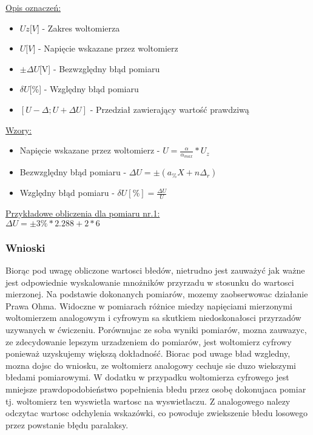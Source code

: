 \documentclass{extarticle}  %
\begin{document}
                \underline{Opis oznaczeń:}
                \begin{itemize}
                    \item $Uz{[}V{]}$ - Zakres woltomierza
                    \item $U{[}V{]}$ - Napięcie wskazane przez woltomierz
                    \item $\pm \Delta U${[}V{]} - Bezwzględny błąd pomiaru
                    \item $\delta U${[}\%{]} - Względny błąd pomiaru
                    \item $[U-\Delta ; U+\Delta U] $ - Przedział zawierający wartość prawdziwą
                \end{itemize}
                \underline{Wzory:}
                \begin{itemize}
                    \item Napięcie wskazane przez woltomierz - $U=\frac{\alpha}{\alpha_{max}}*U_z$
                    \item Bezwzględny błąd pomiaru - $\Delta U=\pm(a_{\%}X+n\Delta _r)$
                    \item Względny błąd pomiaru - $\delta U[\%]=\frac{\Delta U}{U}$
                \end{itemize}   
                \underline{Przykładowe obliczenia dla pomiaru nr.1:}\\
                $\Delta U=\pm 3\%*2.288+2*6$
                
            \subsubsection{Wnioski}
                Biorąc pod uwagę obliczone wartosci błedów, nietrudno jest zauważyć jak ważne
                jest odpowiednie wyskalowanie mnożników przyrzadu w stosunku do wartosci mierzonej. 
                Na podstawie dokonanych pomiarów, mozemy zaobserwowac działanie Prawa Ohma. 
                Widoczne w pomiarach różnice miedzy napięciami mierzonymi woltomierzem analogowym i cyfrowym sa skutkiem niedoskonałosci przyrzadów uzywanych w ćwiczeniu. 
                Porównujac ze soba wyniki pomiarów, mozna zauwazyc, ze zdecydowanie lepszym urzadzeniem do pomiarów, jest woltomierz cyfrowy ponieważ uzyskujemy większą dokładność. 
                Biorac pod uwage bład wzgledny, mozna dojsc do wniosku, ze woltomierz analogowy cechuje sie duzo wiekszymi błedami pomiarowymi.
                W dodatku w przypadku woltomierza cyfrowego jest mniejsze prawdopodobieństwo popełnienia błedu przez osobę dokonujaca pomiar tj.
                woltomierz ten wyswietla wartosc na wyswietlaczu. 
                Z analogowego nalezy odczytac wartosc odchylenia wskazówki, co powoduje zwiekszenie błedu losowego przez powstanie błędu paralaksy.
    
\end{document}
